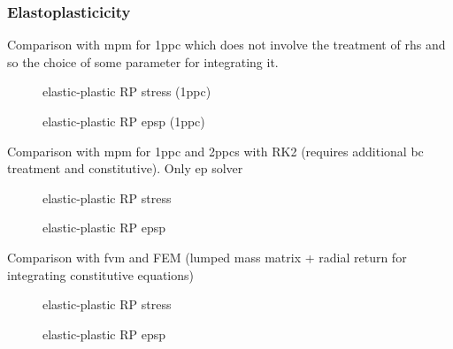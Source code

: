 \subsubsection{Elastoplasticicity}
Comparison with mpm for 1ppc which does not involve the treatment of rhs and so the choice of some parameter for integrating it.
\begin{figure}[h!]
  \centering
  {}
  {}
  {}
  \caption{elastic-plastic RP stress (1ppc)}
  \label{fig:stress_elastoplastic_RP}
\end{figure}
\begin{figure}[h!]
  \centering
  {}
  {}
  {}
  \caption{elastic-plastic RP epsp (1ppc)}
  \label{fig:epsp_elastoplastic_RP}
\end{figure}
Comparison with mpm for 1ppc and 2ppcs with RK2 (requires additional bc treatment and constitutive). Only ep solver
\begin{figure}[h!]
  \centering
  {}
  {}
  {}
  \caption{elastic-plastic RP stress}
  \label{fig:stress_elastoplastic_RP}
\end{figure}
\begin{figure}[h!]
  \centering
  {}
  {}
  {}
  \caption{elastic-plastic RP epsp}
  \label{fig:epsp_elastoplastic_RP}
\end{figure}


Comparison with fvm and FEM (lumped mass matrix + radial return for integrating constitutive equations)
\begin{figure}[h!]
  \centering
  {}
  {}
  {}
  \caption{elastic-plastic RP stress}
  \label{fig:stress_elastoplastic_RP}
\end{figure}
\begin{figure}[h!]
  \centering
  {}
  {}
  {}
  \caption{elastic-plastic RP epsp}
  \label{fig:epsp_elastoplastic_RP}
\end{figure}


